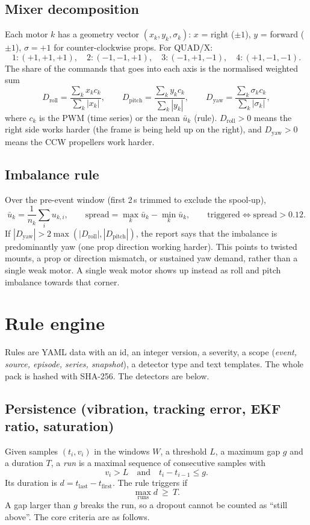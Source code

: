 \documentclass[11pt,a4paper]{article}
\begin{document}
\subsection{Mixer decomposition}
Each motor $k$ has a geometry vector $(x_k,y_k,\sigma_k)$: $x$ = right ($\pm1$), $y$ = forward
($\pm1$), $\sigma=+1$ for counter-clockwise props. For QUAD/X:
\[
1:(+1,+1,+1),\quad 2:(-1,-1,+1),\quad 3:(-1,+1,-1),\quad 4:(+1,-1,-1).
\]
The share of the commands that goes into each axis is the normalised weighted sum
\[
D_{\text{roll}}=\frac{\sum_k x_k c_k}{\sum_k|x_k|},\qquad
D_{\text{pitch}}=\frac{\sum_k y_k c_k}{\sum_k|y_k|},\qquad
D_{\text{yaw}}=\frac{\sum_k \sigma_k c_k}{\sum_k|\sigma_k|},
\]
where $c_k$ is the PWM (time series) or the mean $\bar u_k$ (rule). $D_{\text{roll}}>0$ means the
right side works harder (the frame is being held up on the right), and $D_{\text{yaw}}>0$ means the
CCW propellers work harder.

\subsection{Imbalance rule}
Over the pre-event window (first 2\,s trimmed to exclude the spool-up),
\[
\bar u_k=\frac1{n_k}\sum_i u_{k,i},\qquad
\text{spread}=\max_k\bar u_k-\min_k\bar u_k,\qquad
\text{triggered}\iff\text{spread}>0.12 .
\]
If $|D_{\text{yaw}}|>2\max(|D_{\text{roll}}|,|D_{\text{pitch}}|)$, the report says that the
imbalance is predominantly yaw (one prop direction working harder). This points to twisted
mounts, a prop or direction mismatch, or sustained yaw demand, rather than a single weak motor.
A single weak motor shows up instead as roll and pitch imbalance towards that corner.

\section{Rule engine}

Rules are YAML data with an id, an integer version, a severity, a scope (\emph{event, source,
episode, series, snapshot}), a detector type and text templates. The whole pack is hashed with
SHA-256. The detectors are below.

\subsection{Persistence (vibration, tracking error, EKF ratio, saturation)}
Given samples $(t_i,v_i)$ in the windows $W$, a threshold $L$, a maximum gap $g$ and a duration
$T$, a \emph{run} is a maximal sequence of consecutive samples with
\[
v_i>L\quad\text{and}\quad t_{i}-t_{i-1}\le g .
\]
Its duration is $d=t_{\text{last}}-t_{\text{first}}$. The rule triggers if
\[
\max_{\text{runs}} d \ \ge\ T .
\]
A gap larger than $g$ breaks the run, so a dropout cannot be counted as ``still above''.
The core criteria are as follows.
\end{document}
